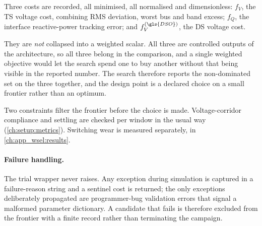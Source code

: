 Three costs are recorded, all minimised, all normalised and dimensionless:
$f_{V}$, the \gls{TS} voltage cost, combining \gls{RMS} deviation, worst bus and band excess; $f_{Q}$, the interface reactive-power tracking error; and $f_{V}^{(\gls{DSO})}$, the \gls{DS} voltage cost.

They are \emph{not} collapsed into a weighted scalar.
All three are controlled outputs of the architecture, so all three belong in the comparison, and a single weighted objective would let the search spend one to buy another without that being visible in the reported number.
The search therefore reports the non-dominated set on the three together, and the design point is a declared choice on a small frontier rather than an optimum.

Two constraints filter the frontier before the choice is made.
Voltage-corridor compliance and settling are checked per window in the usual way (\cref{ch:setup:metrics}).
Switching wear is measured separately, in \cref{ch:app_wsel:results}.

\paragraph{Failure handling.}
\label{ch:app_bo:robustness}%
\label{ch:ofo:tuning:bo:robustness}%
The trial wrapper never raises.
Any exception during simulation is captured in a failure-reason string and a sentinel cost is returned; the only exceptions deliberately propagated are programmer-bug validation errors that signal a malformed parameter dictionary.
A candidate that fails is therefore excluded from the frontier with a finite record rather than terminating the campaign.

